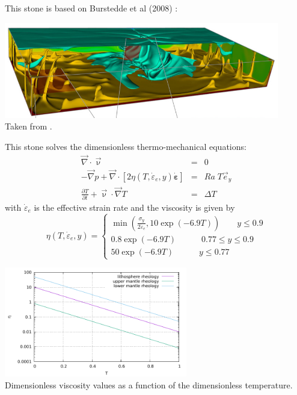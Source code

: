 
This stone is based on Burstedde et al (2008) \cite{bugg08}:

\begin{center}
\includegraphics[width=12cm]{python_codes/fieldstone_88/images/bugg08}\\
{\captionfont Taken from \cite{bugg08}.}
\end{center}

This stone solves the dimensionless thermo-mechanical equations:
\begin{eqnarray}
\vec\nabla\cdot\vec\upnu &=& 0 \\
-\vec\nabla p + \vec\nabla \cdot [ 2 \eta(T,\dot{\varepsilon}_e,y) \dot{\bm \varepsilon} ] &=& Ra\; T \vec{e}_y \\
\frac{\partial T}{\partial t} + \vec\upnu \cdot \vec\nabla T &=& \Delta T
\end{eqnarray}
with $\dot{\varepsilon}_e$ is the effective strain rate and the viscosity is given by 
\[
\eta(T,\dot{\varepsilon}_e,y) =
\left\{
\begin{array}{c}
\min \left(  \frac{\sigma_y}{2 \dot{\varepsilon}_e} , 10\exp(-6.9T)  \right) \qquad y\le 0.9 \\
0.8 \exp(-6.9T) \qquad\quad  0.77\le y \le 0.9 \\
50 \exp(-6.9T) \qquad\quad y \le 0.77 
\end{array}
\right.
\]

\begin{center}
\includegraphics[width=8cm]{python_codes/fieldstone_88/images/visc.pdf}\\
{\captionfont Dimensionless viscosity values as a function of the dimensionless temperature.}
\end{center}

